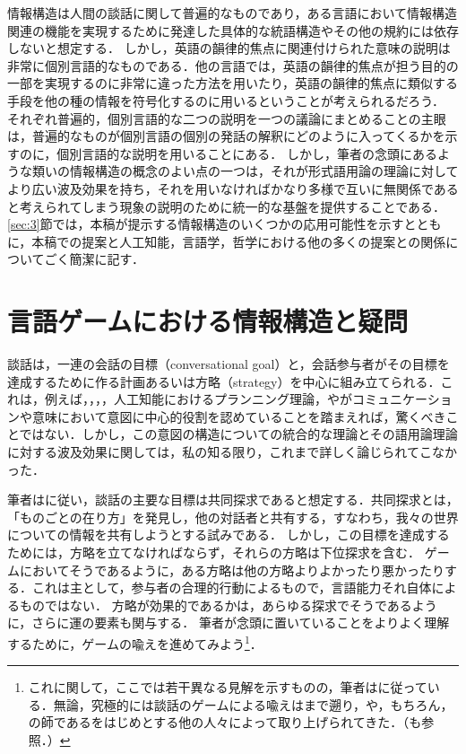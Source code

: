 \documentclass{goken}
\newcommand{\term}[2]{\textsf{#1}（#2）}
\newcommand{\ori}[1]{\noindent\textcolor[gray]{0.7}{\fontsize{8pt}{8pt}\selectfont{\textsf{(p.~#1)}}} }
\begin{document}
情報構造は人間の談話に関して普遍的なものであり，ある言語において情報構造関連の機能を実現するために発達した具体的な統語構造やその他の規約には依存しないと想定する．
しかし，英語の韻律的焦点に関連付けられた意味の説明は非常に個別言語的なものである．他の言語では，英語の韻律的焦点が担う目的の一部を実現するのに非常に違った方法を用いたり，英語の韻律的焦点に類似する手段を他の種の情報を符号化するのに用いるということが考えられるだろう．
それぞれ普遍的，個別言語的な二つの説明を一つの議論にまとめることの主眼は，普遍的なものが個別言語の個別の発話の解釈にどのように入ってくるかを示すのに，個別言語的な説明を用いることにある．
しかし，筆者の念頭にあるような類いの情報構造の概念のよい点の一つは，それが形式語用論の理論に対してより広い波及効果を持ち，それを用いなければかなり多様で互いに無関係であると考えられてしまう現象の説明のために統一的な基盤を提供することである．
\ref{sec:3}節では，本稿が提示する情報構造のいくつかの応用可能性を示すとともに，本稿での提案と人工知能，言語学，哲学における他の多くの提案との関係についてごく簡潔に記す．

\section{言語ゲームにおける情報構造と疑問}\label{sec:1}
談話は，一連の\term{会話の目標}{conversational goal}と，会話参与者がその目標を達成するために作る計画あるいは\term{方略}{strategy}を中心に組み立てられる．これは，例えば，\citet{Grice1989}，\citet{Lewis1969}，\citet{GroszSidner1986}，人工知能におけるプランニング理論，\citet{SperberWilson1986}や\citet{Thomason1990}がコミュニケーションや意味において意図に中心的役割を認めていることを踏まえれば，驚くべきことではない．しかし，この意図の構造についての統合的な理論とその語用論理論に対する波及効果に関しては，私の知る限り，これまで詳しく論じられてこなかった．

\ori{4}
筆者は\citet{Stalnaker1978}に従い，談話の主要な目標は共同探求であると想定する．共同探求とは，「ものごとの在り方」を発見し，他の対話者と共有する，すなわち，我々の世界についての情報を共有しようとする試みである．
しかし，この目標を達成するためには，方略を立てなければならず，それらの方略は下位探求を含む．
ゲームにおいてそうであるように，ある方略は他の方略よりよかったり悪かったりする．これは主として，参与者の合理的行動によるもので，言語能力それ自体によるものではない．
方略が効果的であるかは，あらゆる探求でそうであるように，さらに運の要素も関与する．
筆者が念頭に置いていることをよりよく理解するために，ゲームの喩えを進めてみよう\footnote{これに関して，ここでは若干異なる見解を示すものの，筆者は\citet{Carlson1982}に従っている．無論，究極的には談話のゲームによる喩えは\citet{Wittgenstein1953}まで遡り，\cite{Lewis1969}や，もちろん，\citeauthor{Carlson1982}の師である\citet{Hintikka1972, Hintikka1981}をはじめとする他の人々によって取り上げられてきた．（\citet{HintikkaSaarinen1979}も参照．）}．
\end{document}
